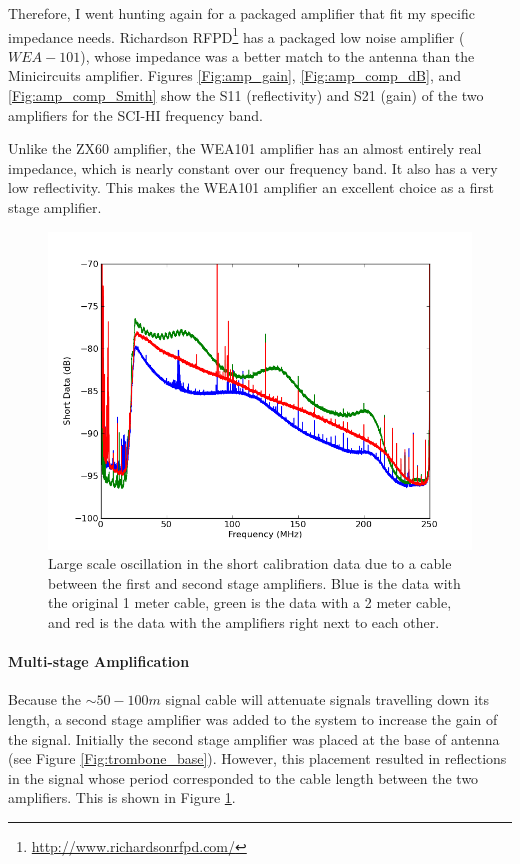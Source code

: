 Therefore, I went hunting again for a packaged amplifier that fit my specific impedance needs. Richardson RFPD\footnote{\url{http://www.richardsonrfpd.com/}} has a packaged low noise amplifier ($WEA-101$), whose impedance was a better match to the antenna than the Minicircuits amplifier. Figures \ref{Fig:amp_gain}, \ref{Fig:amp_comp_dB}, and \ref{Fig:amp_comp_Smith} show the S11 (reflectivity) and S21 (gain) of the two amplifiers for the SCI-HI frequency band. 

Unlike the ZX60 amplifier, the WEA101 amplifier has an almost entirely real impedance, which is nearly constant over our frequency band. It also has a very low reflectivity. This makes the WEA101 amplifier an excellent choice as a first stage amplifier. 

\begin{figure}[htb]
\begin{center}
\includegraphics[width=0.9\linewidth]{SCIHI_system/figures/antenna_rf_cable_reflections.png}
\caption{Large scale oscillation in the short calibration data due to a cable between the first and second stage amplifiers. Blue is the data with the original 1 meter cable, green is the data with a 2 meter cable, and red is the data with the amplifiers right next to each other.}
\label{Fig:amp_reflect}
\end{center}
\end{figure}

\paragraph{Multi-stage Amplification}

Because the $\sim 50-100 m$ signal cable will attenuate signals travelling down its length, a second stage amplifier was added to the system to increase the gain of the signal. Initially the second stage amplifier was placed at the base of antenna (see Figure \ref{Fig:trombone_base}). However, this placement resulted in reflections in the signal whose period corresponded to the cable length between the two amplifiers. This is shown in Figure \ref{Fig:amp_reflect}. 

